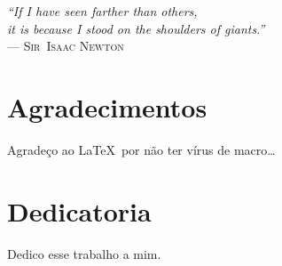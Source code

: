 \clearpage
\begin{flushright}
\mbox{}\vfill
{\sffamily\itshape
``If I have seen farther than others,\\
it is because I stood on the shoulders of giants.''\\}
--- \textsc{Sir~Isaac Newton}
\end{flushright}

\chapter*{Agradecimentos}
Agradeço ao \LaTeX\ por não ter vírus de macro\ldots

\chapter*{Dedicatoria}
Dedico esse trabalho a mim.